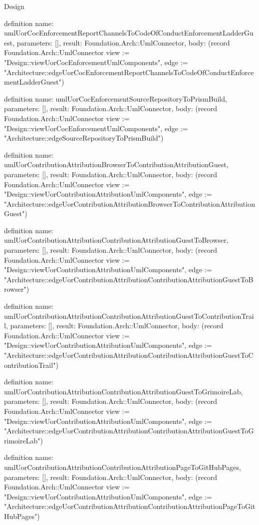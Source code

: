 \begin{lexlean}{Design}
\begin{semanticmodule}
definition{
  name: umlUorCocEnforcementReportChannelsToCodeOfConductEnforcementLadderGuest,
  parameters: [],
  result: Foundation.Arch::UmlConnector,
  body: (record Foundation.Arch::UmlConnector {view := "Design::viewUorCocEnforcementUmlComponents", edge := "Architecture::edgeUorCocEnforcementReportChannelsToCodeOfConductEnforcementLadderGuest"})
}

definition{
  name: umlUorCocEnforcementSourceRepositoryToPrismBuild,
  parameters: [],
  result: Foundation.Arch::UmlConnector,
  body: (record Foundation.Arch::UmlConnector {view := "Design::viewUorCocEnforcementUmlComponents", edge := "Architecture::edgeSourceRepositoryToPrismBuild"})
}

definition{
  name: umlUorContributionAttributionBrowserToContributionAttributionGuest,
  parameters: [],
  result: Foundation.Arch::UmlConnector,
  body: (record Foundation.Arch::UmlConnector {view := "Design::viewUorContributionAttributionUmlComponents", edge := "Architecture::edgeUorContributionAttributionBrowserToContributionAttributionGuest"})
}

definition{
  name: umlUorContributionAttributionContributionAttributionGuestToBrowser,
  parameters: [],
  result: Foundation.Arch::UmlConnector,
  body: (record Foundation.Arch::UmlConnector {view := "Design::viewUorContributionAttributionUmlComponents", edge := "Architecture::edgeUorContributionAttributionContributionAttributionGuestToBrowser"})
}

definition{
  name: umlUorContributionAttributionContributionAttributionGuestToContributionTrail,
  parameters: [],
  result: Foundation.Arch::UmlConnector,
  body: (record Foundation.Arch::UmlConnector {view := "Design::viewUorContributionAttributionUmlComponents", edge := "Architecture::edgeUorContributionAttributionContributionAttributionGuestToContributionTrail"})
}

definition{
  name: umlUorContributionAttributionContributionAttributionGuestToGrimoireLab,
  parameters: [],
  result: Foundation.Arch::UmlConnector,
  body: (record Foundation.Arch::UmlConnector {view := "Design::viewUorContributionAttributionUmlComponents", edge := "Architecture::edgeUorContributionAttributionContributionAttributionGuestToGrimoireLab"})
}

definition{
  name: umlUorContributionAttributionContributionAttributionPageToGitHubPages,
  parameters: [],
  result: Foundation.Arch::UmlConnector,
  body: (record Foundation.Arch::UmlConnector {view := "Design::viewUorContributionAttributionUmlComponents", edge := "Architecture::edgeUorContributionAttributionContributionAttributionPageToGitHubPages"})
}


\end{semanticmodule}
\end{lexlean}
